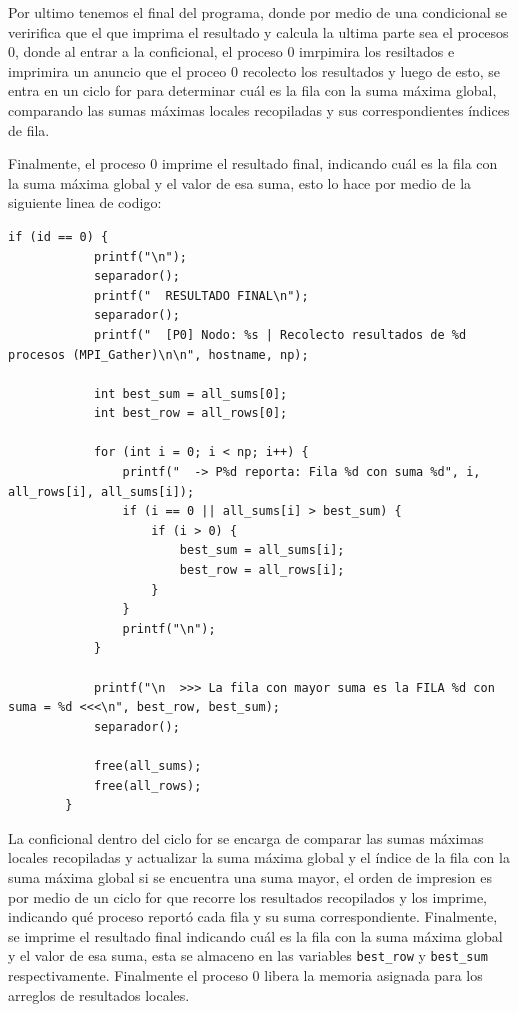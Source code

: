 \documentclass[letterpaper,11pt]{article}
\begin{document}
    Por ultimo tenemos el final del programa, donde por medio de una condicional se veririfica que el que imprima el resultado y calcula la ultima parte sea el procesos 0, donde al entrar a la conficional, el proceso 0 imrpimira los resiltados e imprimira un anuncio que el proceo 0 recolecto los resultados
    y luego de esto, se entra en un ciclo for para determinar cuál es la fila con la suma máxima global, comparando las sumas máximas locales recopiladas y sus correspondientes índices de fila.

    Finalmente, el proceso 0 imprime el resultado final, indicando cuál es la fila con la suma máxima global y el valor de esa suma, esto lo hace por medio de la siguiente linea de codigo:

    \begin{lstlisting}[style=cstyle,caption={Impresion de resultado final en proceso 0},label={lst:programa-b}]
        if (id == 0) {
            printf("\n");
            separador();
            printf("  RESULTADO FINAL\n");
            separador();
            printf("  [P0] Nodo: %s | Recolecto resultados de %d procesos (MPI_Gather)\n\n", hostname, np);

            int best_sum = all_sums[0];
            int best_row = all_rows[0];

            for (int i = 0; i < np; i++) {
                printf("  -> P%d reporta: Fila %d con suma %d", i, all_rows[i], all_sums[i]);
                if (i == 0 || all_sums[i] > best_sum) {
                    if (i > 0) {
                        best_sum = all_sums[i];
                        best_row = all_rows[i];
                    }
                }
                printf("\n");
            }

            printf("\n  >>> La fila con mayor suma es la FILA %d con suma = %d <<<\n", best_row, best_sum);
            separador();

            free(all_sums);
            free(all_rows);
        }
    \end{lstlisting}

    La conficional dentro del ciclo for se encarga de comparar las sumas máximas locales recopiladas y actualizar la suma máxima global y el índice de la fila con la suma máxima global si se encuentra una suma mayor, el orden de impresion es por medio de un ciclo for que recorre los resultados recopilados y los imprime, indicando qué proceso reportó cada fila y su suma correspondiente. Finalmente, se imprime el resultado final indicando cuál es la fila con la suma máxima global y el valor de esa suma, esta se almaceno en las variables \texttt{best\_row} y \texttt{best\_sum} respectivamente. Finalmente el proceso 0 libera la memoria asignada para los arreglos de resultados locales.
\end{document}
